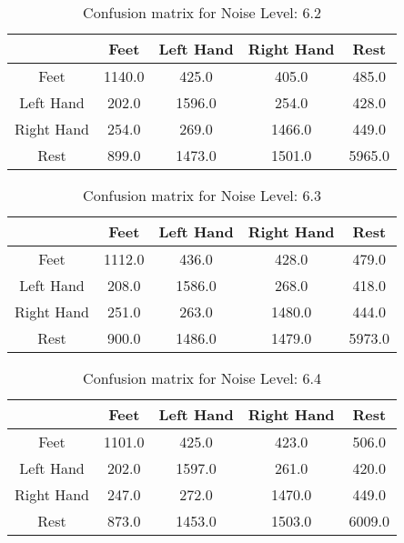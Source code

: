 \begin{table}[!htbp]
    \centering
    \begin{tabular}{|c||c|c|c|c|}
        \hline
		 & Feet & Left Hand & Right Hand & Rest \\
        \hline
        \hline
        Feet & 1140.0 & 425.0 & 405.0 & 485.0 \\
        \hline
        Left Hand & 202.0 & 1596.0 & 254.0 & 428.0 \\
        \hline
        Right Hand & 254.0 & 269.0 & 1466.0 & 449.0 \\
        \hline
        Rest & 899.0 & 1473.0 & 1501.0 & 5965.0 \\
        \hline
    \end{tabular}
    \caption{Confusion matrix for Noise Level: 6.2}
\end{table}

\begin{table}[!htbp]
    \centering
    \begin{tabular}{|c||c|c|c|c|}
        \hline
		 & Feet & Left Hand & Right Hand & Rest \\
        \hline
        \hline
        Feet & 1112.0 & 436.0 & 428.0 & 479.0 \\
        \hline
        Left Hand & 208.0 & 1586.0 & 268.0 & 418.0 \\
        \hline
        Right Hand & 251.0 & 263.0 & 1480.0 & 444.0 \\
        \hline
        Rest & 900.0 & 1486.0 & 1479.0 & 5973.0 \\
        \hline
    \end{tabular}
    \caption{Confusion matrix for Noise Level: 6.3}
\end{table}

\begin{table}[!htbp]
    \centering
    \begin{tabular}{|c||c|c|c|c|}
        \hline
		 & Feet & Left Hand & Right Hand & Rest \\
        \hline
        \hline
        Feet & 1101.0 & 425.0 & 423.0 & 506.0 \\
        \hline
        Left Hand & 202.0 & 1597.0 & 261.0 & 420.0 \\
        \hline
        Right Hand & 247.0 & 272.0 & 1470.0 & 449.0 \\
        \hline
        Rest & 873.0 & 1453.0 & 1503.0 & 6009.0 \\
        \hline
    \end{tabular}
    \caption{Confusion matrix for Noise Level: 6.4}
\end{table}

